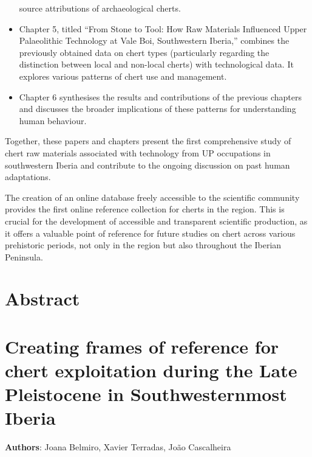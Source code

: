 \documentclass[
  a4paper,
  DIV=11,
  numbers=noendperiod]{scrreprt}
\begin{document}
\begin{itemize}
  source attributions of archaeological cherts.
\item
  Chapter 5, titled ``From Stone to Tool: How Raw Materials Influenced
  Upper Palaeolithic Technology at Vale Boi, Southwestern Iberia,''
  combines the previously obtained data on chert types (particularly
  regarding the distinction between local and non-local cherts) with
  technological data. It explores various patterns of chert use and
  management.
\item
  Chapter 6 synthesises the results and contributions of the previous
  chapters and discusses the broader implications of these patterns for
  understanding human behaviour.
\end{itemize}

Together, these papers and chapters present the first comprehensive
study of chert raw materials associated with technology from UP
occupations in southwestern Iberia and contribute to the ongoing
discussion on past human adaptations.

The creation of an online database freely accessible to the scientific
community provides the first online reference collection for cherts in
the region. This is crucial for the development of accessible and
transparent scientific production, as it offers a valuable point of
reference for future studies on chert across various prehistoric
periods, not only in the region but also throughout the Iberian
Peninsula.


\chapter*{Abstract}\label{abstract-1}


\chapter{Creating frames of reference for chert exploitation during the Late Pleistocene in Southwesternmost Iberia}

\textbf{Authors}: Joana Belmiro, Xavier Terradas, João Cascalheira
\end{document}
